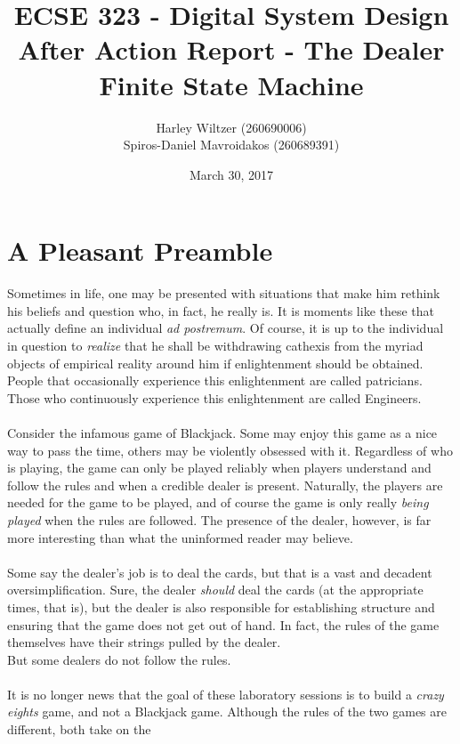 \documentclass[12pt]{report}
\title{ECSE 323 - Digital System Design\\After Action Report - The Dealer Finite State Machine}
\author{Harley Wiltzer (260690006)\\Spiros-Daniel Mavroidakos (260689391)}
\date{March 30, 2017}
\begin{document}
\maketitle
\newpage
\pagestyle{fancy}
\fancyhf{}
\tableofcontents

\part{A Pleasant Preamble}
\lettrine{S}ometimes in life, one may be presented with situations that make him rethink his beliefs and
question who, in fact, he really is. It is moments like these that actually define an individual
\textit{ad postremum}. Of course, it is up to the individual in question to \textit{realize} that he shall be
withdrawing cathexis from the myriad objects of empirical reality around him if enlightenment should
be obtained. People that occasionally experience this enlightenment are called patricians. Those who
continuously experience this enlightenment are called Engineers.\\\\
Consider the infamous game of Blackjack. Some may enjoy this game as a nice way to pass the time,
others may be violently obsessed with it. Regardless of who is playing, the game can only be played
reliably when players understand and follow the rules and when a credible dealer is present.
Naturally, the players are needed for the game to be played, and of course the game is only really
\textit{being played} when the rules are followed. The presence of the dealer, however, is far more
interesting than what the uninformed reader may believe.\\\\
Some say the dealer's job is to deal the cards, but that is a vast and decadent oversimplification.
Sure, the dealer \textit{should} deal the cards (at the appropriate times, that is), but the dealer
is also responsible for establishing structure and ensuring that the game does not get out of hand.
In fact, the rules of the game themselves have their strings pulled by the dealer. \\But some dealers
do not follow the rules.\\\\
It is no longer news that the goal of these laboratory sessions is to build a \textit{crazy eights}
game, and not a Blackjack game. Although the rules of the two games are different, both take on the
\end{document}
